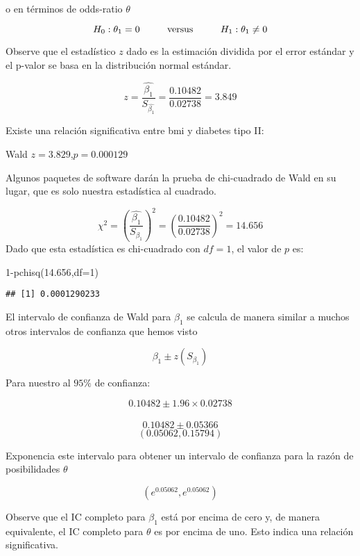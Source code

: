 \documentclass[
]{book}
\newenvironment{Shaded}{\begin{snugshade}}{\end{snugshade}}
\newcommand{\AttributeTok}[1]{\textcolor[rgb]{0.77,0.63,0.00}{#1}}
\newcommand{\DecValTok}[1]{\textcolor[rgb]{0.00,0.00,0.81}{#1}}
\newcommand{\FloatTok}[1]{\textcolor[rgb]{0.00,0.00,0.81}{#1}}
\newcommand{\FunctionTok}[1]{\textcolor[rgb]{0.00,0.00,0.00}{#1}}
\newcommand{\NormalTok}[1]{#1}
\newcommand{\SpecialCharTok}[1]{\textcolor[rgb]{0.00,0.00,0.00}{#1}}
\begin{document}
o en términos de odds-ratio \(\theta\)

\begin{equation}
H_0:\theta_{1}=0  \hspace{1cm} \textup{versus} \hspace{1cm} H_1:\theta_{1}\not= 0
\end{equation}

Observe que el estadístico \(z\) dado es la estimación dividida por el error estándar y el p-valor se basa en la distribución normal estándar.

\[z=\frac{\hat{\beta_1}}{S_{\hat{\beta_1}}}=\frac{0.10482}{0.02738}=3.849 \]

Existe una relación significativa entre bmi y diabetes tipo II:

Wald \(z=3.829\),\(p=0.000129\)

Algunos paquetes de software darán la prueba de chi-cuadrado de Wald en su lugar, que es solo nuestra estadística al cuadrado.

\[ \chi^2=\left(\frac{\hat{\beta_1}}{{S_{\beta_1}}}\right)^2=\left(\frac{0.10482}{0.02738}\right)^2=14.656\]
Dado que esta estadística es chi-cuadrado con \(df=1\), el valor de \(p\) es:

\begin{Shaded}
\begin{Highlighting}[]
\DecValTok{1}\SpecialCharTok{{-}}\FunctionTok{pchisq}\NormalTok{(}\FloatTok{14.656}\NormalTok{,}\AttributeTok{df=}\DecValTok{1}\NormalTok{)}
\end{Highlighting}
\end{Shaded}

\begin{verbatim}
## [1] 0.0001290233
\end{verbatim}

El intervalo de confianza de Wald para \(\beta_1\) se calcula de manera similar a muchos otros intervalos de confianza que hemos visto

\[\beta_1 \pm z(S_{\beta_1})\]

Para nuestro al \(95\%\) de confianza:

\[0.10482 \pm 1.96 \times 0.02738 \]\\
\[0.10482 \pm 0.05366 \]
\[\left( 0.05062,0.15794\right)\]

Exponencia este intervalo para obtener un intervalo de confianza para la razón de posibilidades \(\theta\)

\[\left(e^{0.05062}, e^{0.05062}\right) \]

Observe que el IC completo para \(\beta_1\) está por encima de cero y, de manera equivalente, el IC completo para \(\theta\) es
por encima de uno. Esto indica una relación significativa.
\end{document}
